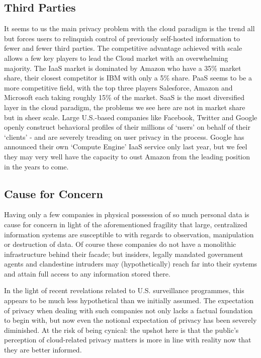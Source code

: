 \documentclass[11pt, a4paper]{article}
\begin{document}
\subsection{Third Parties}
It seems to us the main privacy problem with the cloud paradigm is the trend all but forces users to relinquish control of previously self-hosted information to fewer and fewer third parties.
The competitive advantage achieved with scale allows a few key players to lead the Cloud market with an overwhelming majority.
The IaaS market is dominated by Amazon who have a 35\% market share, their closest competitor is IBM with only a 5\% share.
PaaS seems to be a more competitive field, with the top three players Salesforce, Amazon and Microsoft each taking roughly 15\% of the market.
SaaS is the most diversified layer in the cloud paradigm, the problems we see here are not in market share but in sheer scale.
Large U.S.-based companies like Facebook, Twitter and Google openly construct behavioral profiles of their millions of `users' on behalf of their `clients' - and are severely treading on user privacy in the process.
Google has announced their own `Compute Engine' IaaS service only last year, but we feel they may very well have the capacity to oust Amazon from the leading position in the years to come.

\subsection{Cause for Concern}
Having only a few companies in physical possession of so much personal data is cause for concern in light of the aforementioned fragility that large, centralized information systems are susceptible to with regards to observation, manipulation or destruction of data.
Of course these companies do not have a monolithic infrastructure behind their facade; but insiders, legally mandated government agents and clandestine intruders may (hypothetically) reach far into their systems and attain full access to any information stored there.

In the light of recent revelations related to U.S. surveillance programmes, this appears to be much less hypothetical than we initially assumed.
The expectation of privacy when dealing with such companies not only lacks a factual foundation to begin with, but now even the notional expectation of privacy has been severely diminished.
At the risk of being cynical: the upshot here is that the public's perception of cloud-related privacy matters is more in line with reality now that they are better informed.
\end{document}
